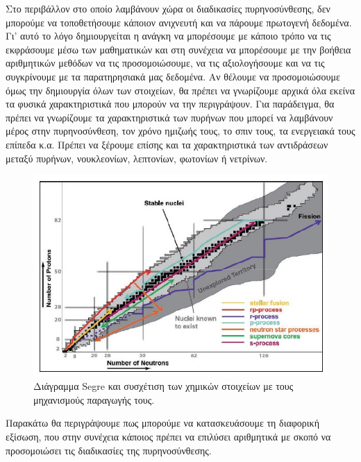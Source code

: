 Στο περιβάλλον στο οποίο λαμβάνουν χώρα οι διαδικασίες πυρηνοσύνθεσης, δεν μπορούμε να τοποθετήσουμε κάποιον ανιχνευτή και να πάρουμε πρωτογενή δεδομένα. Γι' αυτό το λόγο δημιουργείται η ανάγκη να μπορέσουμε με κάποιο τρόπο να τις εκφράσουμε μέσω των μαθηματικών και στη συνέχεια να μπορέσουμε με την βοήθεια αριθμητικών μεθόδων να τις προσομοιώσουμε, να τις αξιολογήσουμε και να τις συγκρίνουμε με τα παρατηρησιακά μας δεδομένα. Αν θέλουμε να προσομοιώσουμε όμως την δημιουργία όλων των στοιχείων, θα πρέπει να γνωρίζουμε αρχικά όλα εκείνα τα φυσικά χαρακτηριστικά που μπορούν να την περιγράψουν. Για παράδειγμα, θα πρέπει να γνωρίζουμε τα χαρακτηριστικά των πυρήνων που μπορεί να λαμβάνουν μέρος στην πυρηνοσύνθεση, τον χρόνο ημιζωής τους, το σπιν τους, τα ενεργειακά τους επίπεδα κ.α. Πρέπει να ξέρουμε επίσης και τα χαρακτηριστικά των αντιδράσεων μεταξύ πυρήνων, νουκλεονίων, λεπτονίων, φωτονίων ή νετρίνων. 

 \begin{figure}
     \centering
     \includegraphics[scale=0.6]{Figures/Screenshot_2.jpg} 
    \caption{Διάγραμμα Segre και συσχέτιση των χημικών στοιχείων με τους μηχανισμούς παραγωγής τους.}
    \label{fig:apx:segre_diagram}
\end{figure} 

Παρακάτω θα περιγράψουμε πως μπορούμε να κατασκευάσουμε τη  διαφορική εξίσωση, που στην συνέχεια κάποιος πρέπει να επιλύσει αριθμητικά με σκοπό να προσομοιώσει τις διαδικασίες της πυρηνοσύνθεσης.  
